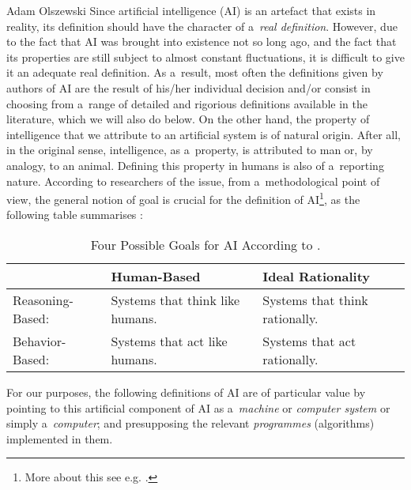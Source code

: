 \begin{artengenv}{Adam Olszewski}
Since artificial intelligence (AI) is an artefact that exists in reality, its definition should have the character of a~\textit{real definition}. However, due to the fact that AI was brought into existence not so long ago, and the fact that its properties are still subject to almost constant fluctuations, it is difficult to give it an adequate real definition. As a~result, most often the definitions given by authors of AI are the result of his/her individual decision and/or consist in choosing from a~range of detailed and rigorious definitions available in the literature, which we will also do below. On the other hand, the property of intelligence that we attribute to an artificial system is of natural origin. After all, in the original sense, intelligence, as a~property, is attributed to man or, by analogy, to an animal. Defining this property in humans is also of a~reporting nature. According to researchers of the issue, from a~methodological point of view, the general notion of goal is crucial for the definition of AI\footnote{More about this see e.g.
\parencite[][]{}.%
}, as the following table summarises 
\parencites[][]{bringsjord_artificial_2022}[cf.][]{russell_artificial_2021}:%






\begin{table}[H]
\begin{small}


\begin{tabularx}{\textwidth}{| m{} | X | X |}
\hline
&
Human-Based &
Ideal Rationality\\\hline
Reasoning-Based: &
Systems that think like humans. &
Systems that think rationally.\\\hline
Behavior-Based: &
Systems that act like humans. &
Systems that act rationally.\\\hline
\end{tabularx}
\end{small}
\caption{Four Possible Goals for AI According to
\parencite[][]{russell_artificial_2021}.%
}
\end{table}

For our purposes, the following definitions of AI are of particular value by pointing to this artificial component of AI as a~\textit{machine} or \textit{computer system} or simply a~\textit{computer}; and presupposing the relevant \textit{programmes} (algorithms) implemented in them.


\end{artengenv}
